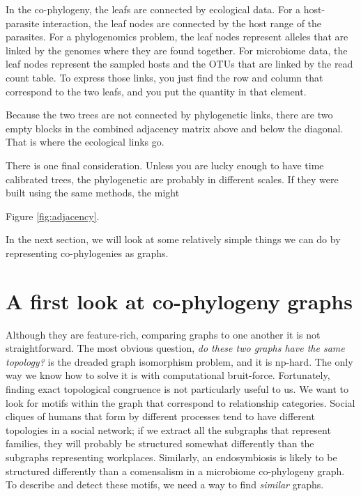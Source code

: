 \documentclass[
10pt, %
a4paper, %
oneside, %
headinclude,footinclude, %
BCOR5mm, %
]{scrartcl}
\begin{document}


In the co-phylogeny, the leafs are connected by ecological data. For a host-parasite interaction, the leaf nodes are connected by the host range of the parasites. For a phylogenomics problem, the leaf nodes represent alleles that are linked by the genomes where they are found together. For microbiome data, the leaf nodes represent the sampled hosts and the OTUs that are linked by the read count table. To express those links, you just find the row and column that correspond to the two leafs, and you put the quantity in that element.

Because the two trees are not connected by phylogenetic links, there are two empty blocks in the combined adjacency matrix above and below the diagonal. That is where the ecological links go. 

There is one final consideration. Unless you are lucky enough to have time calibrated trees, the phylogenetic are probably in different scales. If they were built using the same methods, the might 



Figure \ref{fig:adjacency}.





In the next section, we will look at some relatively simple things we can do by representing co-phylogenies as graphs.

\section{A first look at co-phylogeny graphs}

Although they are feature-rich, comparing graphs to one another it is not straightforward. The most obvious question, {\em do these two graphs have the same topology?} is the dreaded graph isomorphism problem, and it is np-hard. The only way we know how to solve it is with computational bruit-force. Fortunately, finding exact topological congruence is not particularly useful to us. We want to look for motifs within the graph that correspond to relationship categories. Social cliques of humans that form by different processes tend to have different topologies in a social network; if we extract all the subgraphs that represent families, they will probably be structured somewhat differently than the subgraphs representing workplaces. Similarly, an endosymbiosis is likely to be structured differently than a comensalism in a microbiome co-phylogeny graph. To describe and detect these motifs, we need a way to find {\em similar} graphs.
\end{document}
